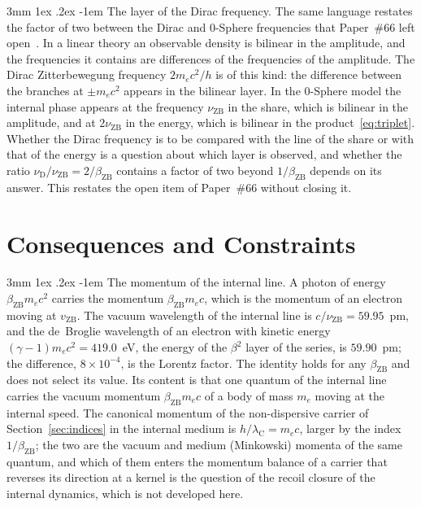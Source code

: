 \documentclass[%
 reprint, amsmath,amssymb, aps, prb, ]{revtex4-2}
\makeatletter
\numberwithin{equation}{section}
\renewcommand\paragraph{%
  \@startsection{paragraph}{4}{\z@}%
    {3mm \@plus 1ex \@minus .2ex}%
    {-1em}%
    {\normalfont\normalsize\itshape}}
\newcommand{\lambdaC}{\lambda_{\mathrm{C}}}
\newcommand{\bZB}{\beta_{\mathrm{ZB}}}
\makeatother
\begin{document}
\paragraph{The layer of the Dirac frequency.} The same language restates the factor of two between the Dirac and 0-Sphere frequencies that Paper~\#66 left open~\cite{H66}. In a linear theory an observable density is bilinear in the amplitude, and the frequencies it contains are differences of the frequencies of the amplitude. The Dirac Zitterbewegung frequency $2m_ec^2/h$ is of this kind: the difference between the branches at $\pm m_ec^2$ appears in the bilinear layer. In the 0-Sphere model the internal phase appears at the frequency $\nu_{\mathrm{ZB}}$ in the share, which is bilinear in the amplitude, and at $2\nu_{\mathrm{ZB}}$ in the energy, which is bilinear in the product~\eqref{eq:triplet}. Whether the Dirac frequency is to be compared with the line of the share or with that of the energy is a question about which layer is observed, and whether the ratio $\nu_{\mathrm{D}}/\nu_{\mathrm{ZB}} = 2/\bZB$ contains a factor of two beyond $1/\bZB$ depends on its answer. This restates the open item of Paper~\#66 without closing it.

\section{Consequences and Constraints}
\label{sec:consequences}

\paragraph{The momentum of the internal line.} A photon of energy $\bZB m_ec^2$ carries the momentum $\bZB m_ec$, which is the momentum of an electron moving at $v_{\mathrm{ZB}}$. The vacuum wavelength of the internal line is $c/\nu_{\mathrm{ZB}} = 59.95$~pm, and the de~Broglie wavelength of an electron with kinetic energy $(\gamma - 1)m_ec^2 = 419.0$~eV, the energy of the $\beta^2$ layer of the series, is $59.90$~pm; the difference, $8\times10^{-4}$, is the Lorentz factor. The identity holds for any $\bZB$ and does not select its value. Its content is that one quantum of the internal line carries the vacuum momentum $\bZB m_ec$ of a body of mass $m_e$ moving at the internal speed. The canonical momentum of the non-dispersive carrier of Section~\ref{sec:indices} in the internal medium is $h/\lambdaC = m_ec$, larger by the index $1/\bZB$; the two are the vacuum and medium (Minkowski) momenta of the same quantum, and which of them enters the momentum balance of a carrier that reverses its direction at a kernel is the question of the recoil closure of the internal dynamics, which is not developed here.
\end{document}
